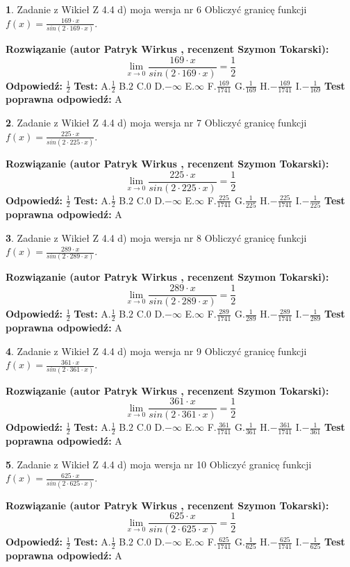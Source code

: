 \documentclass[12pt, a4paper]{article}
\theoremstyle{definition} %
\newtheorem{zad}{}
\newcommand{\zadStart}[1]{\begin{zad}#1\newline}
\newcommand{\zadStop}{\end{zad}}
\newcommand{\rozwStart}[2]{\noindent \textbf{Rozwiązanie (autor #1 , recenzent #2): }\newline}
\newcommand{\rozwStop}{\newline}
\newcommand{\odpStart}{\noindent \textbf{Odpowiedź:}\newline}
\newcommand{\odpStop}{\newline}
\newcommand{\testStart}{\noindent \textbf{Test:}\newline}
\newcommand{\testStop}{\newline}
\newcommand{\kluczStart}{\noindent \textbf{Test poprawna odpowiedź:}\newline}
\newcommand{\kluczStop}{\newline}
\begin{document}
\zadStart{Zadanie z Wikieł Z 4.4 d) moja wersja nr 6}
Obliczyć granicę funkcji $f(x)=\frac{169\cdot x}{sin(2 \cdot169\cdot x)}$.
\zadStop
\rozwStart{Patryk Wirkus}{Szymon Tokarski}
$$\lim\limits_{x\to 0}\frac{169\cdot x}{sin(2 \cdot169\cdot x)}=\frac{1}{2}$$
\rozwStop
\odpStart
$\frac{1}{2}$
\odpStop
\testStart
A.$\frac{1}{2}$
B.$2$
C.$0$
D.$-\infty$
E.$\infty$
F.$\frac{169}{1741}$
G.$\frac{1}{169}$
H.$-\frac{169}{1741}$
I.$-\frac{1}{169}$
\testStop
\kluczStart
A
\kluczStop



\zadStart{Zadanie z Wikieł Z 4.4 d) moja wersja nr 7}
Obliczyć granicę funkcji $f(x)=\frac{225\cdot x}{sin(2 \cdot225\cdot x)}$.
\zadStop
\rozwStart{Patryk Wirkus}{Szymon Tokarski}
$$\lim\limits_{x\to 0}\frac{225\cdot x}{sin(2 \cdot225\cdot x)}=\frac{1}{2}$$
\rozwStop
\odpStart
$\frac{1}{2}$
\odpStop
\testStart
A.$\frac{1}{2}$
B.$2$
C.$0$
D.$-\infty$
E.$\infty$
F.$\frac{225}{1741}$
G.$\frac{1}{225}$
H.$-\frac{225}{1741}$
I.$-\frac{1}{225}$
\testStop
\kluczStart
A
\kluczStop



\zadStart{Zadanie z Wikieł Z 4.4 d) moja wersja nr 8}
Obliczyć granicę funkcji $f(x)=\frac{289\cdot x}{sin(2 \cdot289\cdot x)}$.
\zadStop
\rozwStart{Patryk Wirkus}{Szymon Tokarski}
$$\lim\limits_{x\to 0}\frac{289\cdot x}{sin(2 \cdot289\cdot x)}=\frac{1}{2}$$
\rozwStop
\odpStart
$\frac{1}{2}$
\odpStop
\testStart
A.$\frac{1}{2}$
B.$2$
C.$0$
D.$-\infty$
E.$\infty$
F.$\frac{289}{1741}$
G.$\frac{1}{289}$
H.$-\frac{289}{1741}$
I.$-\frac{1}{289}$
\testStop
\kluczStart
A
\kluczStop



\zadStart{Zadanie z Wikieł Z 4.4 d) moja wersja nr 9}
Obliczyć granicę funkcji $f(x)=\frac{361\cdot x}{sin(2 \cdot361\cdot x)}$.
\zadStop
\rozwStart{Patryk Wirkus}{Szymon Tokarski}
$$\lim\limits_{x\to 0}\frac{361\cdot x}{sin(2 \cdot361\cdot x)}=\frac{1}{2}$$
\rozwStop
\odpStart
$\frac{1}{2}$
\odpStop
\testStart
A.$\frac{1}{2}$
B.$2$
C.$0$
D.$-\infty$
E.$\infty$
F.$\frac{361}{1741}$
G.$\frac{1}{361}$
H.$-\frac{361}{1741}$
I.$-\frac{1}{361}$
\testStop
\kluczStart
A
\kluczStop



\zadStart{Zadanie z Wikieł Z 4.4 d) moja wersja nr 10}
Obliczyć granicę funkcji $f(x)=\frac{625\cdot x}{sin(2 \cdot625\cdot x)}$.
\zadStop
\rozwStart{Patryk Wirkus}{Szymon Tokarski}
$$\lim\limits_{x\to 0}\frac{625\cdot x}{sin(2 \cdot625\cdot x)}=\frac{1}{2}$$
\rozwStop
\odpStart
$\frac{1}{2}$
\odpStop
\testStart
A.$\frac{1}{2}$
B.$2$
C.$0$
D.$-\infty$
E.$\infty$
F.$\frac{625}{1741}$
G.$\frac{1}{625}$
H.$-\frac{625}{1741}$
I.$-\frac{1}{625}$
\testStop
\kluczStart
A
\kluczStop
\end{document}
